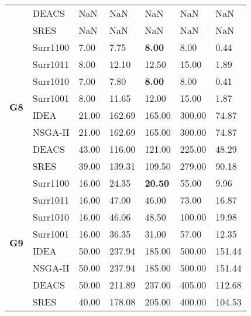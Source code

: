 \begin{table*}[!htb]
\begin{tabular}{lllllll}
		& DEACS         & NaN           & NaN           & NaN             & NaN            & NaN          \\
		& SRES          & NaN           & NaN           & NaN             & NaN            & NaN          \\ \hline
		\multirow{8}{*}{\textbf{G8}}                & Surr1100      & 7.00          & 7.75          & \textbf{8.00}   & 8.00           & 0.44         \\ 
		& Surr1011      & 8.00          & 12.10         & 12.50           & 15.00          & 1.89         \\ 
		& Surr1010      & 7.00          & 7.80          & \textbf{8.00}   & 8.00           & 0.41         \\  
		& Surr1001      & 8.00          & 11.65         & 12.00           & 15.00          & 1.87         \\  
		& IDEA          & 21.00         & 162.69        & 165.00          & 300.00         & 74.87        \\  
		& NSGA-II       & 21.00         & 162.69        & 165.00          & 300.00         & 74.87        \\ 
		& DEACS         & 43.00         & 116.00        & 121.00          & 225.00         & 48.29        \\ 
		& SRES          & 39.00         & 139.31        & 109.50          & 279.00         & 90.18        \\ \hline
		\multirow{8}{*}{\textbf{G9}}                & Surr1100      & 16.00         & 24.35         & \textbf{20.50}  & 55.00          & 9.96         \\ 
		& Surr1011      & 16.00         & 47.00         & 46.00           & 73.00          & 16.87        \\ 
		& Surr1010      & 16.00         & 46.06         & 48.50           & 100.00         & 19.98        \\
		& Surr1001      & 16.00         & 36.35         & 31.00           & 57.00          & 12.35        \\  
		& IDEA          & 50.00         & 237.94        & 185.00          & 500.00         & 151.44       \\ 
		& NSGA-II       & 50.00         & 237.94        & 185.00          & 500.00         & 151.44       \\ 
		& DEACS         & 50.00         & 211.89        & 237.00          & 405.00         & 112.68       \\  
		& SRES          & 40.00         & 178.08        & 205.00          & 400.00         & 104.53       \\ \hline

\end{tabular}
\end{table*}

